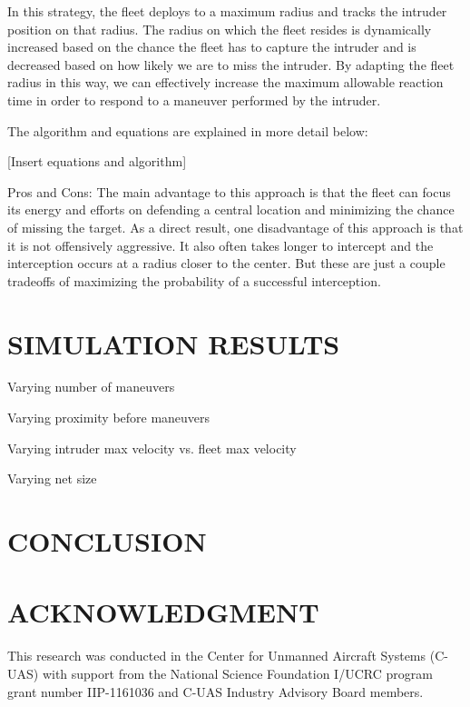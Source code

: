 \documentclass[letterpaper, 10 pt, conference]{ieeeconf}  %
\begin{document}
    In this strategy, the fleet deploys to a maximum radius and tracks the intruder position on that radius. The radius on which the fleet resides is dynamically increased based on the chance the fleet has to capture the intruder and is decreased based on how likely we are to miss the intruder. By adapting the fleet radius in this way, we can effectively increase the maximum allowable reaction time in order to respond to a maneuver performed by the intruder.
	
    The algorithm and equations are explained in more detail below:

[Insert equations and algorithm]

Pros and Cons: The main advantage to this approach is that the fleet can focus its energy and efforts on defending a central location and minimizing the chance of missing the target. As a direct result, one disadvantage of this approach is that it is not offensively aggressive. It also often takes longer to intercept and the interception occurs at a radius closer to the center. But these are just a couple tradeoffs of maximizing the probability of a successful interception.

\section{SIMULATION RESULTS}

Varying number of maneuvers

Varying proximity before maneuvers

Varying intruder max velocity vs. fleet max velocity

Varying net size

\section{CONCLUSION}



\addtolength{\textheight}{-12cm}   %

\section*{ACKNOWLEDGMENT}
This research was conducted in the Center for Unmanned Aircraft Systems (C-UAS) with
support from the National Science Foundation I/UCRC program grant number IIP-1161036 and
C-UAS Industry Advisory Board members.




\end{document}
